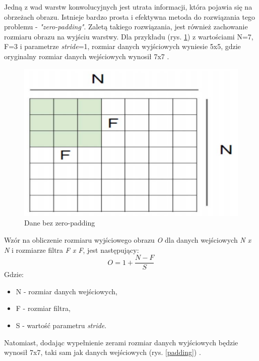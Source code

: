 \documentclass[a4paper,12pt,oneside]{book} %
\begin{document}
Jedną z wad warstw konwolucyjnych jest utrata informacji, która pojawia się na obrzeżach obrazu. Istnieje bardzo prosta i efektywna metoda do rozwiązania tego problemu - \textit{"zero-padding"}. Zaletą takiego rozwiązania, jest również zachowanie rozmiaru obrazu na wyjściu warstwy. Dla przykładu (rys. \ref{no_padding}) z wartościami N=7, F=3 i parametrze \emph{stride}=1, rozmiar danych wyjściowych wyniesie 5x5, gdzie oryginalny rozmiar danych wejściowych wynosił 7x7 \cite{8308186}.

\begin{figure}[h]
	\centering
	\includegraphics[scale=0.45]{no_padding.png}
	\caption{Dane bez zero-padding \cite{8308186}}
	\label{no_padding}
\end{figure}

Wzór na obliczenie rozmiaru wyjściowego obrazu \emph{O} dla danych wejściowych \emph{N x N} i rozmiarze filtra \emph{F x F}, jest następujący:
\begin{equation}
	O = 1 + \frac{N-F}{S}
	\label{nopaddingoutput}
\end{equation}
Gdzie:
\begin{itemize}
	\item N - rozmiar danych wejściowych,
	\item F - rozmiar filtra,
	\item S - wartość parametru \emph{stride}.
\end{itemize}


Natomiast, dodając wypełnienie zerami rozmiar danych wyjściowych będzie wynosił 7x7, taki sam jak danych wejściowych (rys. \ref{padding}) \cite{8308186}. 
\end{document}
